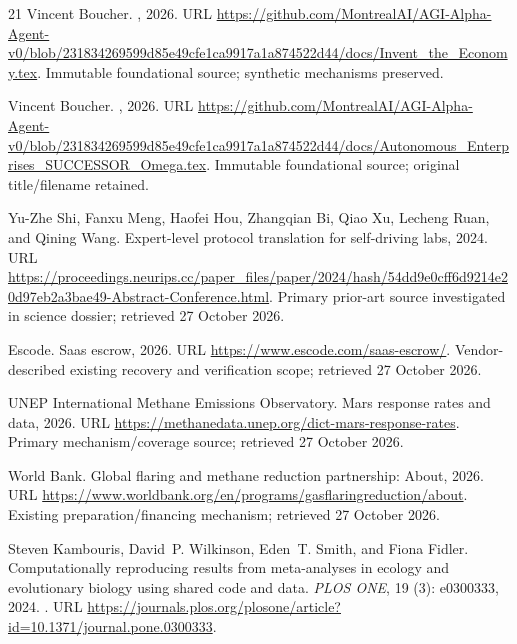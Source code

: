 \documentclass[11pt]{article}
\begin{document}
\begin{thebibliography}{21}
Vincent Boucher.
, 2026{}.
\newblock URL
  \url{https://github.com/MontrealAI/AGI-Alpha-Agent-v0/blob/231834269599d85e49cfe1ca9917a1a874522d44/docs/Invent_the_Economy.tex}.
\newblock Immutable foundational source; synthetic mechanisms preserved.

Vincent Boucher.
,
  2026{}.
\newblock URL
  \url{https://github.com/MontrealAI/AGI-Alpha-Agent-v0/blob/231834269599d85e49cfe1ca9917a1a874522d44/docs/Autonomous_Enterprises_SUCCESSOR_Omega.tex}.
\newblock Immutable foundational source; original title/filename retained.

Yu-Zhe Shi, Fanxu Meng, Haofei Hou, Zhangqian Bi, Qiao Xu, Lecheng Ruan, and
  Qining Wang.
\newblock Expert-level protocol translation for self-driving labs, 2024.
\newblock URL
  \url{https://proceedings.neurips.cc/paper_files/paper/2024/hash/54dd9e0cff6d9214e20d97eb2a3bae49-Abstract-Conference.html}.
\newblock Primary prior-art source investigated in science dossier; retrieved
  27 October 2026.

{Escode}.
\newblock Saas escrow, 2026.
\newblock URL \url{https://www.escode.com/saas-escrow/}.
\newblock Vendor-described existing recovery and verification scope; retrieved
  27 October 2026.

{UNEP International Methane Emissions Observatory}.
\newblock Mars response rates and data, 2026.
\newblock URL \url{https://methanedata.unep.org/dict-mars-response-rates}.
\newblock Primary mechanism/coverage source; retrieved 27 October 2026.

{World Bank}.
\newblock Global flaring and methane reduction partnership: About, 2026.
\newblock URL
  \url{https://www.worldbank.org/en/programs/gasflaringreduction/about}.
\newblock Existing preparation/financing mechanism; retrieved 27 October 2026.

Steven Kambouris, David~P. Wilkinson, Eden~T. Smith, and Fiona Fidler.
\newblock Computationally reproducing results from meta-analyses in ecology and
  evolutionary biology using shared code and data.
\newblock \emph{PLOS ONE}, 19 (3): e0300333, 2024.
\newblock {}.
\newblock URL
  \url{https://journals.plos.org/plosone/article?id=10.1371/journal.pone.0300333}.


\end{thebibliography}
\end{document}
